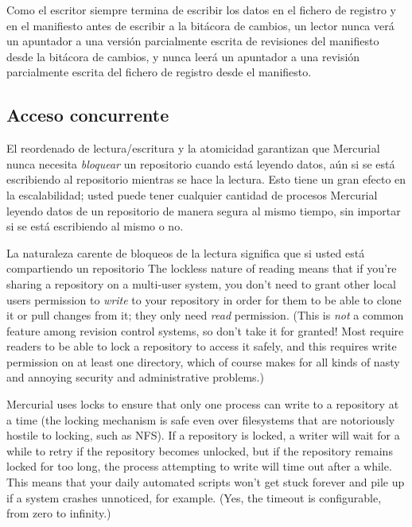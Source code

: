 Como el escritor siempre termina de escribir los datos en el fichero
de registro y en el manifiesto antes de escribir a la bitácora de
cambios, un lector nunca verá un apuntador a una versión parcialmente
escrita de revisiones del manifiesto desde la bitácora de cambios, y
nunca leerá un apuntador a una revisión parcialmente escrita del
fichero de registro desde el manifiesto.

\subsection{Acceso concurrente}

El reordenado de lectura/escritura y la atomicidad garantizan que
Mercurial nunca necesita \emph{bloquear} un repositorio cuando está
leyendo datos, aún si se está escribiendo al repositorio mientras se
hace la lectura. Esto tiene un gran efecto en la escalabilidad; usted
puede tener cualquier cantidad de procesos Mercurial leyendo datos de
un repositorio de manera segura al mismo tiempo, sin importar si se
está escribiendo al mismo o no.

La naturaleza carente de bloqueos de la lectura significa que si usted
está compartiendo un repositorio
The lockless nature of reading means that if you're sharing a
repository on a multi-user system, you don't need to grant other local
users permission to \emph{write} to your repository in order for them
to be able to clone it or pull changes from it; they only need
\emph{read} permission.  (This is \emph{not} a common feature among
revision control systems, so don't take it for granted!  Most require
readers to be able to lock a repository to access it safely, and this
requires write permission on at least one directory, which of course
makes for all kinds of nasty and annoying security and administrative
problems.)

Mercurial uses locks to ensure that only one process can write to a
repository at a time (the locking mechanism is safe even over
filesystems that are notoriously hostile to locking, such as NFS).  If
a repository is locked, a writer will wait for a while to retry if the
repository becomes unlocked, but if the repository remains locked for
too long, the process attempting to write will time out after a while.
This means that your daily automated scripts won't get stuck forever
and pile up if a system crashes unnoticed, for example.  (Yes, the
timeout is configurable, from zero to infinity.)

